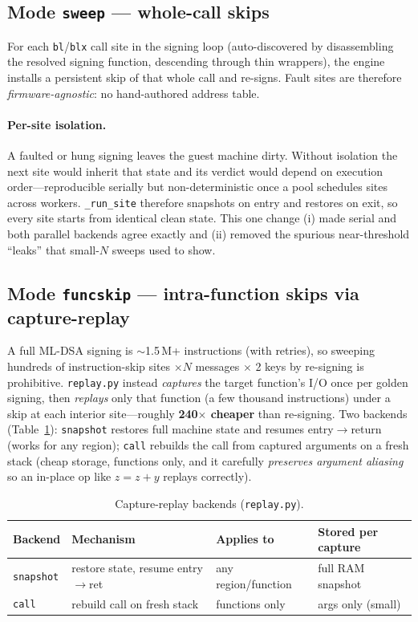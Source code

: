 \documentclass[11pt]{article}
\newcommand{\code}[1]{\texttt{#1}}
\begin{document}
\subsection{Mode \code{sweep} --- whole-call skips}
For each \code{bl}/\code{blx} call site in the signing loop (auto-discovered by
disassembling the resolved signing function, descending through thin wrappers), the
engine installs a persistent skip of that whole call and re-signs. Fault sites are
therefore \emph{firmware-agnostic}: no hand-authored address table.

\paragraph{Per-site isolation.} A faulted or hung signing leaves the guest machine
dirty. Without isolation the next site would inherit that state and its verdict
would depend on execution order---reproducible serially but non-deterministic once
a pool schedules sites across workers. \code{\_run\_site} therefore snapshots on
entry and restores on exit, so every site starts from identical clean state. This
one change (i) made serial and both parallel backends agree exactly and (ii)
removed the spurious near-threshold ``leaks'' that small-$N$ sweeps used to show.

\subsection{Mode \code{funcskip} --- intra-function skips via capture-replay}
A full ML-DSA signing is $\sim$1.5\,M+ instructions (with retries), so sweeping
hundreds of instruction-skip sites $\times N$ messages $\times$ 2 keys by re-signing
is prohibitive. \code{replay.py} instead \emph{captures} the target function's I/O
once per golden signing, then \emph{replays} only that function (a few thousand
instructions) under a skip at each interior site---roughly \textbf{240$\times$
cheaper} than re-signing. Two backends (Table~\ref{tab:backends}): \code{snapshot}
restores full machine state and resumes entry$\to$return (works for any region);
\code{call} rebuilds the call from captured arguments on a fresh stack (cheap
storage, functions only, and it carefully \emph{preserves argument aliasing} so an
in-place op like $z=z+y$ replays correctly).

\begin{table}[h]
\centering\small
\caption{Capture-replay backends (\code{replay.py}).}
\label{tab:backends}
\begin{tabular}{@{}llll@{}}
\toprule
Backend & Mechanism & Applies to & Stored per capture \\
\midrule
\code{snapshot} & restore state, resume entry$\to$ret & any region/function & full RAM snapshot \\
\code{call}     & rebuild call on fresh stack         & functions only      & args only (small) \\
\bottomrule
\end{tabular}
\end{table}
\end{document}
